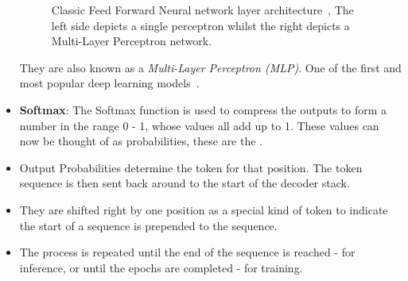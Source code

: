 \begin{itemize}
\begin{figure}[H]
		      \label{fig:feed_forward}
		      \caption{Classic Feed Forward Neural network layer architecture~\autocite{guptaDeepLearningFeedforward2018}, The left side depicts
			      a single perceptron whilst the right depicts a Multi-Layer Perceptron network.}
	      \end{figure}
	      They are also known as a \emph{Multi-Layer Perceptron (MLP)}. One of the first and most popular deep learning models~\autocite{FeedforwardNeuralNetwork2022}.
	\item \textbf{Softmax}: The Softmax function is used to compress the outputs to form a number in the range 0 - 1,
	      whose values all add up to 1. These values can now be thought of as probabilities, these are the .
	\item Output Probabilities determine the token for that position. The token sequence is then sent back around to the start of the decoder stack.
	\item They are shifted right by one position as a special kind of token to indicate the start of a sequence is prepended to the sequence.
	\item The process is repeated until the end of the sequence is reached - for inference, or until the epochs are completed - for training.
\end{itemize}

